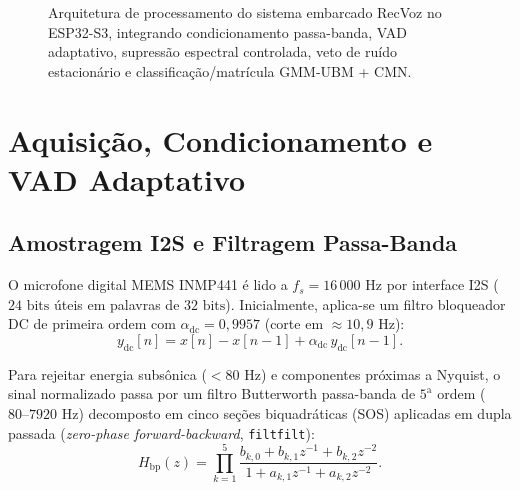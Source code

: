 \documentclass[9pt,technote,a4paper]{IEEEtran}
\begin{document}
\begin{figure}[t]
    \caption{Arquitetura de processamento do sistema embarcado RecVoz no ESP32-S3, integrando condicionamento passa-banda, VAD adaptativo, supressão espectral controlada, veto de ruído estacionário e classificação/matrícula GMM-UBM + CMN.}
    \label{fig:arquitetura}
\end{figure}

\section{Aquisição, Condicionamento e VAD Adaptativo}
\label{sec:vad}

\subsection{Amostragem I2S e Filtragem Passa-Banda}
O microfone digital MEMS INMP441 é lido a $f_s = 16\,000\text{ Hz}$ por interface I2S ($24\text{ bits}$ úteis em palavras de $32\text{ bits}$). Inicialmente, aplica-se um filtro bloqueador DC de primeira ordem com $\alpha_{\mathrm{dc}} = 0{,}9957$ (corte em $\approx 10{,}9\text{ Hz}$):
\begin{equation}
    y_{\mathrm{dc}}[n] = x[n] - x[n-1] + \alpha_{\mathrm{dc}}\, y_{\mathrm{dc}}[n-1].
\end{equation}

Para rejeitar energia subsônica ($< 80\text{ Hz}$) e componentes próximas a Nyquist, o sinal normalizado passa por um filtro Butterworth passa-banda de $5^\text{a}$ ordem ($80\text{--}7920\text{ Hz}$) decomposto em cinco seções biquadráticas (SOS) aplicadas em dupla passada (\textit{zero-phase forward-backward}, \texttt{filtfilt}):
\begin{equation}
    H_{\mathrm{bp}}(z) = \prod_{k=1}^{5} \frac{b_{k,0} + b_{k,1} z^{-1} + b_{k,2} z^{-2}}{1 + a_{k,1} z^{-1} + a_{k,2} z^{-2}}.
\end{equation}
\end{document}
